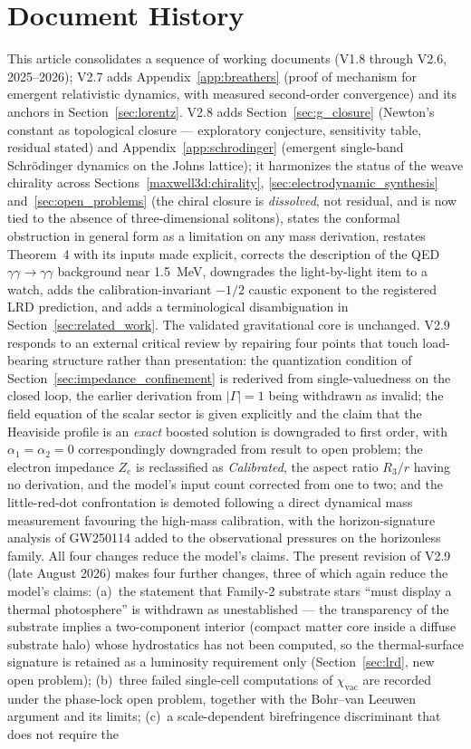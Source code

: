 \documentclass[11pt,a4paper]{article}
\theoremstyle{plain}
\theoremstyle{remark}
\begin{document}
\section{Document History}
This article consolidates a sequence of working documents (V1.8 through V2.6, 2025--2026); V2.7 adds Appendix~\ref{app:breathers} (proof of mechanism for emergent relativistic dynamics, with measured second-order convergence) and its anchors in Section~\ref{sec:lorentz}. V2.8 adds Section~\ref{sec:g_closure} (Newton's constant as topological closure --- exploratory conjecture, sensitivity table, residual stated) and Appendix~\ref{app:schrodinger} (emergent single-band Schr\"odinger dynamics on the Johns lattice); it harmonizes the status of the weave chirality across Sections~\ref{maxwell3d:chirality}, \ref{sec:electrodynamic_synthesis} and~\ref{sec:open_problems} (the chiral closure is \emph{dissolved}, not residual, and is now tied to the absence of three-dimensional solitons), states the conformal obstruction in general form as a limitation on any mass derivation, restates Theorem~4 with its inputs made explicit, corrects the description of the QED $\gamma\gamma\to\gamma\gamma$ background near 1.5~MeV, downgrades the light-by-light item to a watch, adds the calibration-invariant $-1/2$ caustic exponent to the registered LRD prediction, and adds a terminological disambiguation in Section~\ref{sec:related_work}. The validated gravitational core is unchanged. V2.9 responds to an external critical review by repairing four points that touch load-bearing structure rather than presentation: the quantization condition of Section~\ref{sec:impedance_confinement} is rederived from single-valuedness on the closed loop, the earlier derivation from $|\Gamma| = 1$ being withdrawn as invalid; the field equation of the scalar sector is given explicitly and the claim that the Heaviside profile is an \emph{exact} boosted solution is downgraded to first order, with $\alpha_1 = \alpha_2 = 0$ correspondingly downgraded from result to open problem; the electron impedance $Z_e$ is reclassified as \emph{Calibrated}, the aspect ratio $R_3/r$ having no derivation, and the model's input count corrected from one to two; and the little-red-dot confrontation is demoted following a direct dynamical mass measurement favouring the high-mass calibration, with the horizon-signature analysis of GW250114 added to the observational pressures on the horizonless family. All four changes reduce the model's claims. The present revision of V2.9 (late August 2026) makes four further changes, three of which again reduce the model's claims: (a)~the statement that Family-2 substrate stars ``must display a thermal photosphere'' is withdrawn as unestablished --- the transparency of the substrate implies a two-component interior (compact matter core inside a diffuse substrate halo) whose hydrostatics has not been computed, so the thermal-surface signature is retained as a luminosity requirement only (Section~\ref{sec:lrd}, new open problem); (b)~three failed single-cell computations of $\chi_{\text{vac}}$ are recorded under the phase-lock open problem, together with the Bohr--van Leeuwen argument and its limits; (c)~a scale-dependent birefringence discriminant that does not require the 
\end{document}
